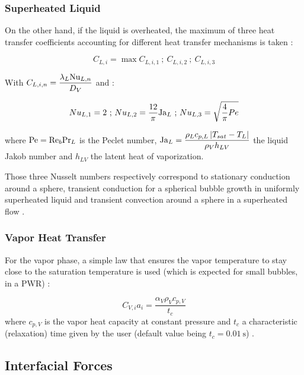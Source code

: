 \subsubsection{Superheated Liquid}

On the other hand, if the liquid is overheated, the maximum of three heat transfer coefficients accounting for different heat transfer mechanisms is taken \cite{berne_analyse_1983}:

\begin{equation}
C_{L,i}=\max{C_{L,i,1}\ ;\ C_{L,i,2}\ ;\ C_{L,i,3}}
\label{eq:ncfd_supheat_L}
\end{equation}

With $C_{L,i,n}=\dfrac{\lambda_{L}\mathrm{Nu}_{L,n}}{D_{V}}$ and :

\begin{equation}
\label{eq:nusselt}
 Nu_{L,1}=2 \text{ ; } Nu_{L,2}=\frac{12}{\pi} \mathrm{Ja}_{L} \text{ ; }  Nu_{L,3}=\sqrt{\frac{4}{\pi}Pe} 
\end{equation}


where $\mathrm{Pe}=\mathrm{Re}_{b} \mathrm{Pr}_{L}$ is the Peclet number, $\mathrm{Ja}_{L}=\dfrac{ \rho_{L}c_{p,L}\left| T_{sat}-T_{L} \right|}{\rho_{V} h_{LV}} $ the liquid Jakob number and $h_{LV}$ the latent heat of vaporization. 

\npar

Those three Nusselt numbers respectively correspond to stationary conduction around a sphere, transient conduction for a spherical bubble growth in uniformly superheated liquid \cite{plesset_growth_1954} and transient convection around a sphere in a superheated flow \cite{ruckenstein_mass_1964}.

\subsubsection{Vapor Heat Transfer}

For the vapor phase, a simple law that ensures the vapor temperature to stay close to the saturation temperature is used (which is expected for small bubbles, \eg in a PWR) :

\begin{equation}
C_{V,i}a_{i}=\frac{\alpha_{V}\rho_{V}c_{p,V}}{t_{c}}
\label{eq:ncfd_vap_relaxation}
\end{equation}
where $c_{p,V}$ is the vapor heat capacity at constant pressure and $t_{c}$ a characteristic (relaxation) time given by the user (default value being $t_{c}=0.01\ \text{s}$) .

\subsection{Interfacial Forces}
\label{subsec:ncfd_interf_qdm}

